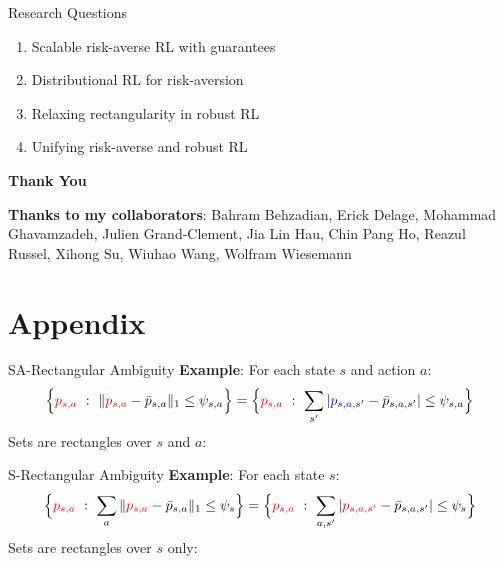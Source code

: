 \documentclass{beamer}
\newcommand{\tc}[2]{\textcolor{#1}{#2}}
\newcommand{\tcb}[1]{\tc{blue}{#1}}
\newcommand{\tcr}[1]{\tc{red}{#1}}
\begin{document}
\begin{frame}{Research Questions}
  \begin{enumerate}
  \item Scalable risk-averse RL with guarantees
    \vfill 
  \item Distributional RL for risk-aversion
    \vfill 
  \item Relaxing rectangularity in robust RL
    \vfill 
  \item Unifying risk-averse and robust RL
  \end{enumerate}
\end{frame}

\begin{frame}
  \begin{center}
    \textbf{Thank You}
  \end{center}
  \vfill 
 \textbf{Thanks to my collaborators}: Bahram Behzadian, Erick Delage, Mohammad Ghavamzadeh, Julien Grand-Clement, Jia Lin Hau, Chin Pang Ho,  Reazul Russel, Xihong Su, Wiuhao Wang, Wolfram Wiesemann
\end{frame}

\appendix
\section{Appendix}

\begin{frame}{SA-Rectangular Ambiguity}
	\textbf{Example}: For each state $s$ and action $a$:
	\[ \Bigl\{ \tcr{p_{s,a}} ~:~ \| \tcr{p_{s,a}} - \bar{p}_{s,a} \|_1 \le \psi_{s,a}   \Bigr\} = \Bigl\{ \tcr{p_{s,a}} ~:~  \sum_{s'} |\tcb{p_{s,a,s'}} - \bar{p}_{s,a,s'} | \le \psi_{s,a} \Bigr\} \]
	\vfill
	Sets are rectangles over $s$ and $a$:
	\begin{center}
	\end{center}
\end{frame}

\begin{frame}{S-Rectangular Ambiguity}
	\textbf{Example}: For each state $s$:
	\[ \Bigl\{ \tcr{p_{s,a}} ~:~ \sum_a \| \tcr{p_{s,a}} - \bar{p}_{s,a} \|_1 \le \psi_{s}   \Bigr\} = \Bigl\{ \tcr{p_{s,a}} ~:~  \sum_{a,s'} |\tcr{p_{s,a,s'}} - \bar{p}_{s,a,s'} | \le \psi_{s} \Bigr\} \]
	\vfill
	Sets are rectangles over $s$ only:
	\begin{center}
	\end{center}
\end{frame}

% 	
% 		
\end{document}
